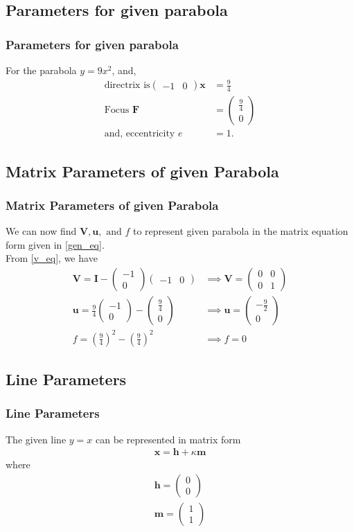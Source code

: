 \documentclass{beamer}
\providecommand{\brak}[1]{\ensuremath{\left(#1\right)}}
\theoremstyle{remark}
\newcommand{\myvec}[1]{\ensuremath{\begin{pmatrix}#1\end{pmatrix}}}
\let\vec\mathbf
\numberwithin{equation}{section}
\begin{document}
\subsection{Parameters for given parabola}
\begin{frame}
  \frametitle{Parameters for given parabola}
  For the parabola $y = 9 x^2$, and,
  \begin{align}
    \text{directrix is} \myvec{-1&0}\vec{x} &= \frac{9}{4}\\
    \text{Focus } \vec{F} &= \myvec{\frac{9}{4}\\0}\\
    \text{and, eccentricity } e &= 1.
  \end{align}
\end{frame}

\subsection{Matrix Parameters of given Parabola}
\begin{frame}
  \frametitle{Matrix Parameters of given Parabola}
  We can now find $\vec{V}, \vec{u}, \text{ and } f$ to represent given parabola in the matrix equation form given in \ref{gen_eq}.\\
  From \ref{v_eq}, we have
  \begin{align}
    \vec{V} = \vec{I}  - \myvec{-1\\0} \myvec{-1&0} &\implies \vec{V} = \myvec{0&0\\0&1}\\
    \vec{u} = \frac{9}{4} \myvec{-1\\0} - \myvec{\frac{9}{4}\\0} &\implies \vec{u} = \myvec{-\frac{9}{2}\\0} \\
    f = \brak{\frac{9}{4}}^2 - \brak{\frac{9}{4}}^2  &\implies f = 0
  \end{align}
\end{frame}



\subsection{Line Parameters}
\begin{frame}
  \frametitle{Line Parameters}
  The given line $y=x$ can be represented in matrix form 
  \begin{align}
    \vec{x} = \vec{h} + \kappa \vec{m}
  \end{align}
  where
  \begin{align}
    \vec{h} = \myvec{0\\0} \\
    \vec{m} = \myvec{1\\1}
  \end{align}
\end{frame}
\end{document}
